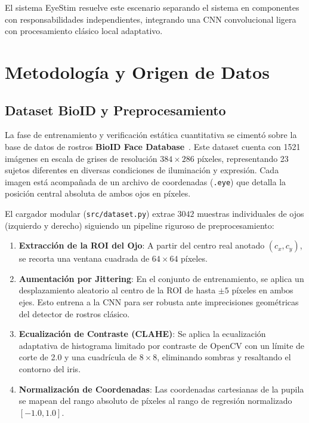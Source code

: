 \documentclass[twocolumn,10pt,letterpaper]{article}
\begin{document}
El sistema EyeStim resuelve este escenario separando el sistema en componentes con responsabilidades independientes, integrando una CNN convolucional ligera con procesamiento clásico local adaptativo.

\section{Metodología y Origen de Datos}

\subsection{Dataset BioID y Preprocesamiento}
La fase de entrenamiento y verificación estática cuantitativa se cimentó sobre la base de datos de rostros \textbf{BioID Face Database}~\cite{jesorsky2001}. Este dataset cuenta con 1521 imágenes en escala de grises de resolución $384 \times 286$ píxeles, representando 23 sujetos diferentes en diversas condiciones de iluminación y expresión. Cada imagen está acompañada de un archivo de coordenadas (\texttt{.eye}) que detalla la posición central absoluta de ambos ojos en píxeles.

El cargador modular (\texttt{src/dataset.py}) extrae $3042$ muestras individuales de ojos (izquierdo y derecho) siguiendo un pipeline riguroso de preprocesamiento:
\begin{enumerate}
    \item \textbf{Extracción de la ROI del Ojo}: A partir del centro real anotado $(c_x, c_y)$, se recorta una ventana cuadrada de $64 \times 64$ píxeles.
    \item \textbf{Aumentación por Jittering}: En el conjunto de entrenamiento, se aplica un desplazamiento aleatorio al centro de la ROI de hasta $\pm 5$ píxeles en ambos ejes. Esto entrena a la CNN para ser robusta ante imprecisiones geométricas del detector de rostros clásico.
    \item \textbf{Ecualización de Contraste (CLAHE)}: Se aplica la ecualización adaptativa de histograma limitado por contraste de OpenCV con un límite de corte de 2.0 y una cuadrícula de $8\times8$, eliminando sombras y resaltando el contorno del iris.
    \item \textbf{Normalización de Coordenadas}: Las coordenadas cartesianas de la pupila se mapean del rango absoluto de píxeles al rango de regresión normalizado $[-1.0, 1.0]$.
\end{enumerate}
\end{document}
